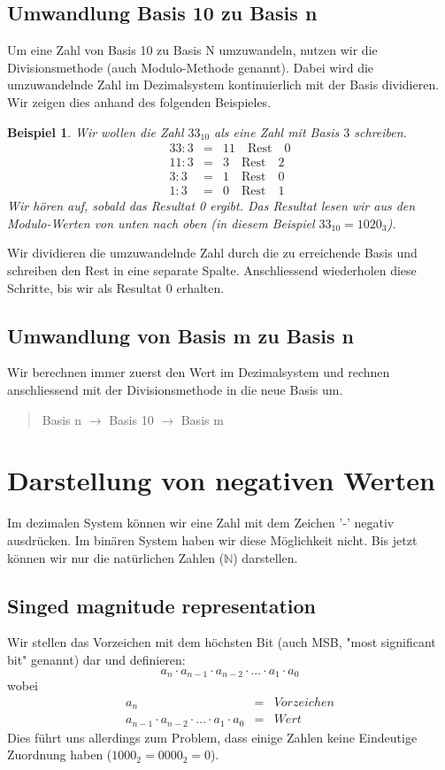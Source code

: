 \documentclass{report}
\newtheorem{myexample}{Beispiel}
\begin{document}
\subsection{Umwandlung Basis 10 zu Basis n}
Um eine Zahl von Basis 10 zu Basis N umzuwandeln, nutzen wir die Divisionsmethode (auch Modulo-Methode genannt). Dabei wird die umzuwandelnde Zahl im Dezimalsystem kontinuierlich mit der Basis dividieren. Wir zeigen dies anhand des folgenden Beispieles.
\begin{myexample}Wir wollen die Zahl $33_{10}$ als eine Zahl mit Basis $3$ schreiben.
\begin{eqnarray}
33 : 3 &=& 11 \quad \mbox{Rest} \quad 0 \nonumber \\
11 : 3 &=& 3 \quad \mbox{Rest} \quad 2 \nonumber \\
3 : 3 &=& 1 \quad \mbox{Rest} \quad 0 \nonumber \\
1 : 3 &=& 0 \quad \mbox{Rest} \quad 1\end{eqnarray}
Wir hören auf, sobald das Resultat 0 ergibt. Das Resultat lesen wir aus den Modulo-Werten von unten nach oben (in diesem Beispiel $33_{10} = 1020_3$).
\end{myexample}Wir dividieren die umzuwandelnde Zahl durch die zu erreichende Basis und schreiben den Rest in eine separate Spalte. Anschliessend wiederholen diese Schritte, bis wir als Resultat 0 erhalten.
\subsection{Umwandlung von Basis m zu Basis n}
Wir berechnen immer zuerst den Wert im Dezimalsystem und rechnen anschliessend mit der Divisionsmethode in die neue Basis um.
\begin{quote}Basis n $\to$ Basis 10 $\to$ Basis m\end{quote}
\newpage
\section{Darstellung von negativen Werten}
Im dezimalen System können wir eine Zahl mit dem Zeichen '-' negativ ausdrücken. Im binären System haben wir diese Möglichkeit nicht. Bis jetzt können wir nur die natürlichen Zahlen ($\mathbb{N}$) darstellen.
\subsection{Singed magnitude representation}
Wir stellen das Vorzeichen mit dem höchsten Bit (auch MSB, "most significant bit" genannt) dar und definieren:
\begin{equation}a_n \cdot a_{n-1} \cdot a_{n-2} \cdot ... \cdot a_1 \cdot a_0\end{equation}
wobei
\begin{eqnarray}a_n&=&Vorzeichen\nonumber \\
a_{n-1} \cdot a_{n-2} \cdot ... \cdot a_1 \cdot a_0 &=& Wert\end{eqnarray}
Dies führt uns allerdings zum Problem, dass einige Zahlen keine Eindeutige Zuordnung haben ($1000_2 = 0000_2 = 0$).
\end{document}
